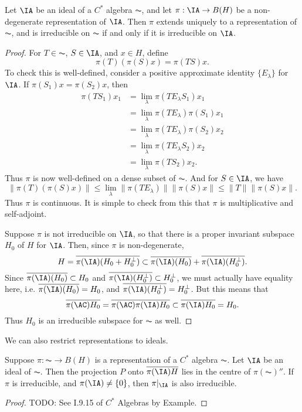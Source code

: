 \begin{lemma}
    Let $\IA$ be an ideal of a $C^*$ algebra $\AC$, and let $\pi: \IA \to B(H)$ be a non-degenerate representation of $\IA$. Then $\pi$ extends uniquely to a representation of $\AC$, and is irreducible on $\AC$ if and only if it is irreducible on $\IA$.
\end{lemma}
\begin{proof}
    For $T \in \AC$, $S \in \IA$, and $x \in H$, define
    \[ \pi(T)( \pi(S) x ) = \pi(TS) x. \]
    To check this is well-defined, consider a positive approximate identity $\{ E_\lambda \}$ for $\IA$. If $\pi(S_1) x = \pi(S_2) x$, then
    \begin{align*}
        \pi(TS_1)x_1 &= \lim_\lambda \pi(T E_\lambda S_1) x_1\\
        &= \lim_\lambda \pi(T E_\lambda) \pi(S_1) x_1\\
        &= \lim_\lambda \pi(T E_\lambda) \pi(S_2) x_2\\
        &= \lim_\lambda \pi(T E_\lambda S_2) x_2\\
        &= \lim_\lambda \pi(T S_2) x_2.
    \end{align*}
    Thus $\pi$ is now well-defined on a dense subset of $\AC$. And for $S \in \IA$, we have
    \[ \| \pi(T)(\pi(S) x) \| \leq \lim_\lambda \| \pi(T E_\lambda) \| \| \pi(S) x \| \leq \| T \| \| \pi(S) x \|. \]
    Thus $\pi$ is continuous. It is simple to check from this that $\pi$ is multiplicative and self-adjoint.

    Suppose $\pi$ is not irreducible on $\IA$, so that there is a proper invariant subspace $H_0$ of $H$ for $\IA$. Then, since $\pi$ is non-degenerate,
    \[ H = \overline{\pi(\IA)(H_0 + H_0^\perp)} \subset \overline{\pi(\IA)(H_0)} + \overline{\pi(\IA)(H_0^\perp)}. \]
    Since $\overline{\pi(\IA)(H_0)} \subset H_0$ and $\overline{\pi(\IA)(H_0^\perp)} \subset H_0^\perp$, we must actually have equality here, i.e. $\overline{\pi(\IA)(H_0)} = H_0$, and $\overline{\pi(\IA)(H_0^\perp)} = H_0^\perp$. But this means that
    \[ \overline{\pi(\AC) H_0} = \overline{\pi(\AC) \pi(\IA) H_0} \subset \overline{\pi(\IA) H_0} = H_0. \]
    Thus $H_0$ is an irreducible subspace for $\AC$ as well.
\end{proof}

We can also restrict representations to ideals.

\begin{lemma}
    Suppose $\pi: \AC \to B(H)$ is a representation of a $C^*$ algebra $\AC$. Let $\IA$ be an ideal of $\AC$. Then the projection $P$ onto $\overline{\pi(\IA) H}$ lies in the centre of $\pi(\AC)''$. If $\pi$ is irreducible, and $\pi(\IA) \neq \{ 0 \}$, then $\pi|_{\IA}$ is also irreducible.
\end{lemma}
\begin{proof}
    TODO: See I.9.15 of $C^*$ Algebras by Example.
\end{proof}


